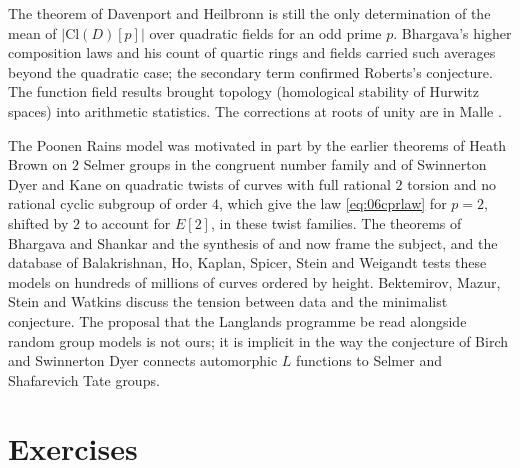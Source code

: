 The theorem of Davenport and Heilbronn \cite{davenportheilbronn1971} is still the only determination of the mean of $|\mathrm{Cl}(D)[p]|$ over quadratic fields for an odd prime $p$. Bhargava's higher composition laws and his count of quartic rings and fields \cite{bhargava2005} carried such averages beyond the quadratic case; the secondary term \cite{bst2013,taniguchithorne2013} confirmed Roberts's conjecture. The function field results \cite{evw2016} brought topology (homological stability of Hurwitz spaces) into arithmetic statistics. The corrections at roots of unity are in Malle \cite{malle2008}.

The Poonen Rains model \cite{poonenrains2012} was motivated in part by the earlier theorems of Heath Brown on $2$ Selmer groups in the congruent number family and of Swinnerton Dyer and Kane on quadratic twists of curves with full rational $2$ torsion and no rational cyclic subgroup of order $4$, which give the law \eqref{eq:06cprlaw} for $p = 2$, shifted by $2$ to account for $E[2]$, in these twist families. The theorems of Bhargava and Shankar \cite{bhargavashankar2015,bhargavashankar2015b,bhargavashankar2013} and the synthesis of \cite{bklpr2015} and \cite{ppvw2019} now frame the subject, and the database of Balakrishnan, Ho, Kaplan, Spicer, Stein and Weigandt \cite{bhkssw2016} tests these models on hundreds of millions of curves ordered by height. Bektemirov, Mazur, Stein and Watkins \cite{bmsw2007} discuss the tension between data and the minimalist conjecture. The proposal that the Langlands programme be read alongside random group models is not ours; it is implicit in the way the conjecture of Birch and Swinnerton Dyer connects automorphic $L$ functions to Selmer and Shafarevich Tate groups.

\section{Exercises}

